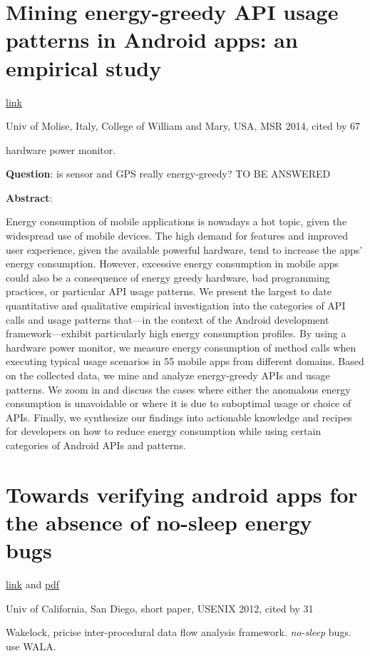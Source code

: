 \documentclass{article}
\begin{document}
\section{Mining energy-greedy API usage patterns in Android apps: an empirical
  study}

\href{http://dl.acm.org/citation.cfm?id=2597085}{link}

Univ of Molise, Italy, College of William and Mary, USA, MSR 2014, cited by 67

hardware power monitor.

\textbf{Question}: is sensor and GPS really energy-greedy? TO BE ANSWERED

\textbf{Abstract}:

Energy consumption of mobile applications is nowadays a hot topic, given the
widespread use of mobile devices. The high demand for features and improved user
experience, given the available powerful hardware, tend to increase the apps’
energy consumption. However, excessive energy consumption in mobile apps could
also be a consequence of energy greedy hardware, bad programming practices, or
particular API usage patterns. We present the largest to date quantitative and
qualitative empirical investigation into the categories of API calls and usage
patterns that—in the context of the Android development framework—exhibit
particularly high energy consumption profiles. By using a hardware power
monitor, we measure energy consumption of method calls when executing typical
usage scenarios in 55 mobile apps from different domains. Based on the collected
data, we mine and analyze energy-greedy APIs and usage patterns. We zoom in and
discuss the cases where either the anomalous energy consumption is unavoidable
or where it is due to suboptimal usage or choice of APIs. Finally, we synthesize
our findings into actionable knowledge and recipes for developers on how to
reduce energy consumption while using certain categories of Android APIs and
patterns.

\section{Towards verifying android apps for the absence of no-sleep energy bugs}
\href{http://dl.acm.org/citation.cfm?id=2387872}{link} and 
\href{https://www.usenix.org/system/files/conference/hotpower12/hotpower12-final27.pdf}{pdf}

Univ of California, San Diego, short paper, USENIX 2012, cited by 31

Wakelock, pricise inter-procedural data flow analysis framework. \emph{no-sleep}
bugs. use WALA.
\end{document}
